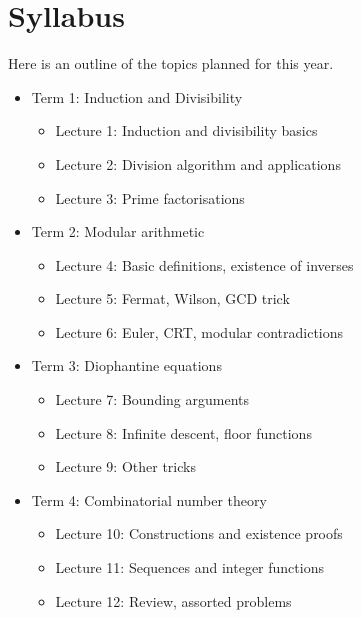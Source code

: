 \documentclass{article}
\begin{document}
\section{Syllabus}
Here is an outline of the topics planned for this year.
\begin{itemize}
  \item Term 1: Induction and Divisibility
    \begin{itemize}
      \item Lecture 1: Induction and divisibility basics
      \item Lecture 2: Division algorithm and applications
      \item Lecture 3: Prime factorisations
    \end{itemize}
  \item Term 2: Modular arithmetic
    \begin{itemize}
      \item Lecture 4: Basic definitions, existence of inverses
      \item Lecture 5: Fermat, Wilson, GCD trick
      \item Lecture 6: Euler, CRT, modular contradictions
    \end{itemize}
  \item Term 3: Diophantine equations
    \begin{itemize}
      \item Lecture 7: Bounding arguments
      \item Lecture 8: Infinite descent, floor functions
      \item Lecture 9: Other tricks
    \end{itemize}
  \item Term 4: Combinatorial number theory
    \begin{itemize}
      \item Lecture 10: Constructions and existence proofs
      \item Lecture 11: Sequences and integer functions
      \item Lecture 12: Review, assorted problems
    \end{itemize}
\end{itemize}
\end{document}

